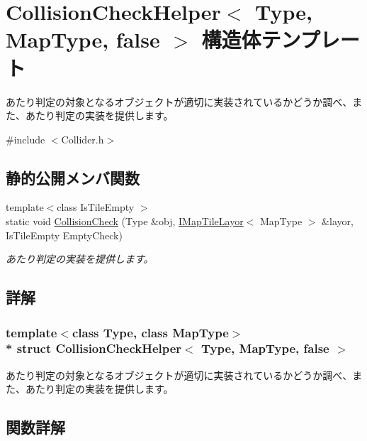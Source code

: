 \hypertarget{struct_collision_check_helper_3_01_type_00_01_map_type_00_01false_01_4}{}\section{Collision\+Check\+Helper$<$ Type, Map\+Type, false $>$ 構造体テンプレート}
\label{struct_collision_check_helper_3_01_type_00_01_map_type_00_01false_01_4}


あたり判定の対象となるオブジェクトが適切に実装されているかどうか調べ、また、あたり判定の実装を提供します。 




{\ttfamily \#include $<$Collider.\+h$>$}

\subsection*{静的公開メンバ関数}
\begin{DoxyCompactItemize}
\item 
{\footnotesize template$<$class Is\+Tile\+Empty $>$ }\\static void \hyperlink{struct_collision_check_helper_3_01_type_00_01_map_type_00_01false_01_4_a7d6844ba94ca1f792ccf2b2bddc7c47c}{Collision\+Check} (Type \&obj, \hyperlink{class_i_map_tile_layor}{I\+Map\+Tile\+Layor}$<$ Map\+Type $>$ \&layor, Is\+Tile\+Empty Empty\+Check)
\begin{DoxyCompactList}\small\item\em あたり判定の実装を提供します。\end{DoxyCompactList}\end{DoxyCompactItemize}


\subsection{詳解}
\subsubsection*{template$<$class Type, class Map\+Type$>$\\*
struct Collision\+Check\+Helper$<$ Type, Map\+Type, false $>$}

あたり判定の対象となるオブジェクトが適切に実装されているかどうか調べ、また、あたり判定の実装を提供します。



\subsection{関数詳解}
